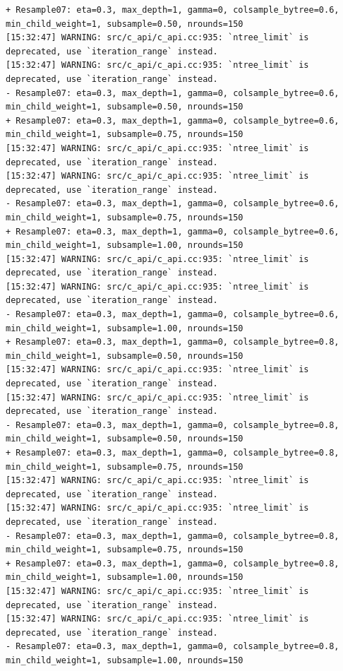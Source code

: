 \documentclass[
  letterpaper,
  DIV=11,
  numbers=noendperiod]{scrartcl}
\begin{document}
\begin{verbatim}
+ Resample07: eta=0.3, max_depth=1, gamma=0, colsample_bytree=0.6, min_child_weight=1, subsample=0.50, nrounds=150 
[15:32:47] WARNING: src/c_api/c_api.cc:935: `ntree_limit` is deprecated, use `iteration_range` instead.
[15:32:47] WARNING: src/c_api/c_api.cc:935: `ntree_limit` is deprecated, use `iteration_range` instead.
- Resample07: eta=0.3, max_depth=1, gamma=0, colsample_bytree=0.6, min_child_weight=1, subsample=0.50, nrounds=150 
+ Resample07: eta=0.3, max_depth=1, gamma=0, colsample_bytree=0.6, min_child_weight=1, subsample=0.75, nrounds=150 
[15:32:47] WARNING: src/c_api/c_api.cc:935: `ntree_limit` is deprecated, use `iteration_range` instead.
[15:32:47] WARNING: src/c_api/c_api.cc:935: `ntree_limit` is deprecated, use `iteration_range` instead.
- Resample07: eta=0.3, max_depth=1, gamma=0, colsample_bytree=0.6, min_child_weight=1, subsample=0.75, nrounds=150 
+ Resample07: eta=0.3, max_depth=1, gamma=0, colsample_bytree=0.6, min_child_weight=1, subsample=1.00, nrounds=150 
[15:32:47] WARNING: src/c_api/c_api.cc:935: `ntree_limit` is deprecated, use `iteration_range` instead.
[15:32:47] WARNING: src/c_api/c_api.cc:935: `ntree_limit` is deprecated, use `iteration_range` instead.
- Resample07: eta=0.3, max_depth=1, gamma=0, colsample_bytree=0.6, min_child_weight=1, subsample=1.00, nrounds=150 
+ Resample07: eta=0.3, max_depth=1, gamma=0, colsample_bytree=0.8, min_child_weight=1, subsample=0.50, nrounds=150 
[15:32:47] WARNING: src/c_api/c_api.cc:935: `ntree_limit` is deprecated, use `iteration_range` instead.
[15:32:47] WARNING: src/c_api/c_api.cc:935: `ntree_limit` is deprecated, use `iteration_range` instead.
- Resample07: eta=0.3, max_depth=1, gamma=0, colsample_bytree=0.8, min_child_weight=1, subsample=0.50, nrounds=150 
+ Resample07: eta=0.3, max_depth=1, gamma=0, colsample_bytree=0.8, min_child_weight=1, subsample=0.75, nrounds=150 
[15:32:47] WARNING: src/c_api/c_api.cc:935: `ntree_limit` is deprecated, use `iteration_range` instead.
[15:32:47] WARNING: src/c_api/c_api.cc:935: `ntree_limit` is deprecated, use `iteration_range` instead.
- Resample07: eta=0.3, max_depth=1, gamma=0, colsample_bytree=0.8, min_child_weight=1, subsample=0.75, nrounds=150 
+ Resample07: eta=0.3, max_depth=1, gamma=0, colsample_bytree=0.8, min_child_weight=1, subsample=1.00, nrounds=150 
[15:32:47] WARNING: src/c_api/c_api.cc:935: `ntree_limit` is deprecated, use `iteration_range` instead.
[15:32:47] WARNING: src/c_api/c_api.cc:935: `ntree_limit` is deprecated, use `iteration_range` instead.
- Resample07: eta=0.3, max_depth=1, gamma=0, colsample_bytree=0.8, min_child_weight=1, subsample=1.00, nrounds=150 

\end{verbatim}
\end{document}
